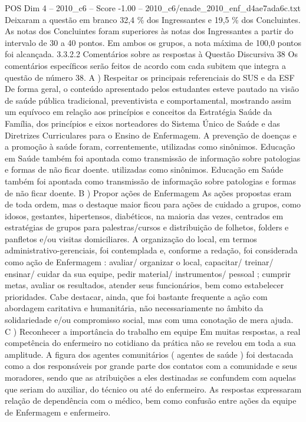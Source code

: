 \begin{textsample}{POS Dim 4 – 2010\_c6 – Score -1.00 – 2010\_c6/enade\_2010\_enf\_d4ae7ada6c.txt}
Deixaram a questão em branco 32,4 \% dos Ingressantes e 19,5 \% dos Concluintes.
As notas dos Concluintes foram superiores às notas dos Ingressantes a partir do intervalo de 30 a 40 pontos.
Em ambos os grupos, a nota máxima de 100,0 pontos foi alcançada. 3.3.2.2 Comentários sobre as respostas à Questão Discursiva 38 Os comentários específicos serão feitos de acordo com cada subitem que integra a questão de número 38.
A ) Respeitar os principais referenciais do SUS e da ESF De forma geral, o conteúdo apresentado pelos estudantes esteve pautado na visão de saúde pública tradicional, preventivista e comportamental, mostrando assim um equívoco em relação aos princípios e conceitos da Estratégia Saúde da Família, dos princípios e eixos norteadores do Sistema Único de Saúde e das Diretrizes Curriculares para o Ensino de Enfermagem.
A prevenção de doenças e a promoção à saúde foram, correntemente, utilizadas como sinônimos.
Educação em Saúde também foi apontada como transmissão de informação sobre patologias e formas de não ficar doente. utilizadas como sinônimos.
Educação em Saúde também foi apontada como transmissão de informação sobre patologias e formas de não ficar doente.
B ) Propor ações de Enfermagem As ações propostas eram de toda ordem, mas o destaque maior ficou para ações de cuidado a grupos, como idosos, gestantes, hipertensos, diabéticos, na maioria das vezes, centrados em estratégias de grupos para palestras/cursos e distribuição de folhetos, folders e panfletos e/ou visitas domiciliares.
A organização do local, em termos administrativo-gerenciais, foi contemplada e, conforme a redação, foi considerada como ação de Enfermagem : avaliar/ organizar o local, capacitar/ treinar/ ensinar/ cuidar da sua equipe, pedir material/ instrumentos/ pessoal ; cumprir metas, avaliar os resultados, atender seus funcionários, bem como estabelecer prioridades.
Cabe destacar, ainda, que foi bastante frequente a ação com abordagem caritativa e humanitária, não necessariamente no âmbito da solidariedade e/ou compromisso social, mas com uma conotação de mera ajuda.
C ) Reconhecer a importância do trabalho em equipe Em muitas respostas, a real competência do enfermeiro no cotidiano da prática não se revelou em toda a sua amplitude.
A figura dos agentes comunitários ( agentes de saúde ) foi destacada como a dos responsáveis por grande parte dos contatos com a comunidade e seus moradores, sendo que as atribuições a eles destinadas se confundem com aquelas que seriam do auxiliar, do técnico ou até do enfermeiro.
As respostas expressaram relação de dependência com o médico, bem como confusão entre ações da equipe de Enfermagem e enfermeiro.

\end{textsample}
